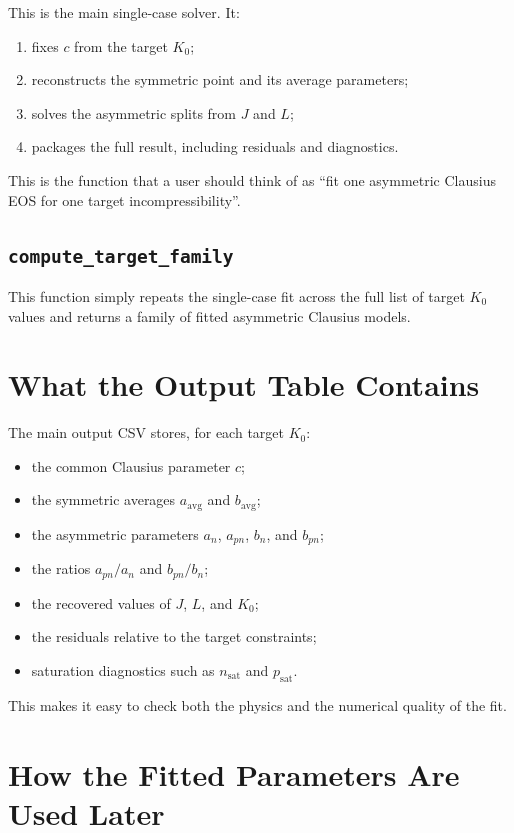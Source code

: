\documentclass[11pt]{article}
\begin{document}
This is the main single-case solver. It:
\begin{enumerate}
\item fixes $c$ from the target $K_0$;
\item reconstructs the symmetric point and its average parameters;
\item solves the asymmetric splits from $J$ and $L$;
\item packages the full result, including residuals and diagnostics.
\end{enumerate}

This is the function that a user should think of as
``fit one asymmetric Clausius EOS for one target incompressibility''.

\subsection{\texttt{compute\_target\_family}}

This function simply repeats the single-case fit across the full list of target
$K_0$ values and returns a family of fitted asymmetric Clausius models.

\section{What the Output Table Contains}

The main output CSV stores, for each target $K_0$:
\begin{itemize}
\item the common Clausius parameter $c$;
\item the symmetric averages $a_{\mathrm{avg}}$ and $b_{\mathrm{avg}}$;
\item the asymmetric parameters $a_n$, $a_{pn}$, $b_n$, and $b_{pn}$;
\item the ratios $a_{pn}/a_n$ and $b_{pn}/b_n$;
\item the recovered values of $J$, $L$, and $K_0$;
\item the residuals relative to the target constraints;
\item saturation diagnostics such as $n_{\mathrm{sat}}$ and $p_{\mathrm{sat}}$.
\end{itemize}

This makes it easy to check both the physics and the numerical quality of the
fit.

\section{How the Fitted Parameters Are Used Later}
\end{document}
